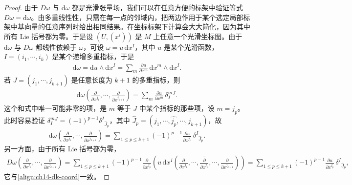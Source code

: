 \documentclass[../../main.tex]{subfiles}
\begin{document}
\begin{proof}
由于 $D\omega$ 与 $\mathrm{d}\omega$ 都是光滑张量场，我们可以在任意方便的标架中验证等式 $D\omega=\mathrm{d}\omega$。由多重线性性，只需在每一点的邻域内，把两边作用于某个选定局部标架中基向量的任意序列时给出相同结果。在坐标标架下计算会大大简化，因为其中所有 Lie 括号都为零。于是设 $(U,(x^i))$ 是 $M$ 上任意一个光滑坐标图。由于 $\mathrm{d}\omega$ 与 $D\omega$ 都线性依赖于 $\omega$，可设 $\omega=u\,\mathrm{d}x^I$，其中 $u$ 是某个光滑函数，$I=(i_1,\cdots ,i_k)$ 是某个递增多重指标，于是
\begin{align*}
\mathrm{d}\omega=\mathrm{d}u\wedge\mathrm{d}x^I=\sum_m\frac{\partial u}{\partial x^m}\,\mathrm{d}x^m\wedge\mathrm{d}x^I.
\end{align*}
若 $J=(j_1,\cdots ,j_{k+1})$ 是任意长度为 $k+1$ 的多重指标，则
\begin{align*}
\mathrm{d}\omega\left(\frac{\partial}{\partial x^{j_1}},\cdots ,\frac{\partial}{\partial x^{j_{k+1}}}\right)
=\sum_m\frac{\partial u}{\partial x^m}\,\delta^m_I{}^J.
\end{align*}
这个和式中唯一可能非零的项，是 $m$ 等于 $J$ 中某个指标的那些项，设 $m=j_p$。此时容易验证 $\delta^m_I{}^J=(-1)^{p-1}\delta^I{}_{\widehat J_p}$，其中 $\widehat J_p=(j_1,\cdots ,\widehat{j_p},\cdots ,j_{k+1})$，故
\begin{align}
\mathrm{d}\omega\left(\frac{\partial}{\partial x^{j_1}},\cdots ,\frac{\partial}{\partial x^{j_{k+1}}}\right)
=\sum_{1\leqslant p\leqslant k+1}(-1)^{p-1}\frac{\partial u}{\partial x^{j_p}}\,\delta^I{}_{\widehat J_p}.\label{align:ch14-dk-coord}
\end{align}
另一方面，由于所有 Lie 括号都为零，
\begin{align*}
D\omega\left(\frac{\partial}{\partial x^{j_1}},\cdots ,\frac{\partial}{\partial x^{j_{k+1}}}\right)
=\sum_{1\leqslant p\leqslant k+1}(-1)^{p-1}\frac{\partial}{\partial x^{j_p}}
\left(u\,\mathrm{d}x^I\left(\frac{\partial}{\partial x^{j_1}},\cdots ,\frac{\widehat{\partial}}{\partial x^{j_p}},\cdots ,\frac{\partial}{\partial x^{j_{k+1}}}\right)\right)
=\sum_{1\leqslant p\leqslant k+1}(-1)^{p-1}\frac{\partial u}{\partial x^{j_p}}\,\delta^I{}_{\widehat J_p},
\end{align*}
它与\eqref{align:ch14-dk-coord}一致。
\end{proof}
\end{document}
